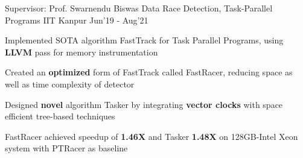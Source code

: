 
\begin{cventries}

  \cventry
  {Supervisor: Prof. Swarnendu Biswas}
  {Data Race Detection, Task-Parallel Programs}
  {IIT Kanpur}
  {Jun'19 - Aug'21}
  {
    \begin{cvitems}
 \item Implemented SOTA algorithm FastTrack for Task Parallel Programs, using \textbf{LLVM} pass for memory instrumentation
 \item Created an \textbf{optimized} form of FastTrack called FastRacer, reducing space as well as time complexity of detector
 \item Designed  \textbf{novel} algorithm Tasker by
 integrating 
 \textbf{vector clocks}
  with space efficient
 tree-based techniques
   
 \item FastRacer achieved speedup of \textbf{1.46X} and Tasker \textbf{1.48X} on 128GB-Intel Xeon system with PTRacer as baseline
 
% 
    \end{cvitems}
  }

\end{cventries}
